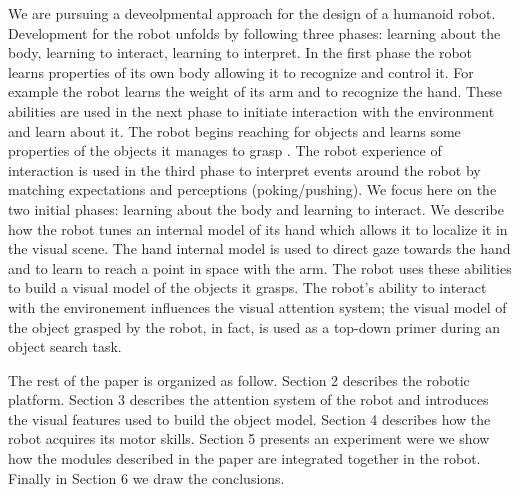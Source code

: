 We are pursuing a deveolpmental approach for the design of a humanoid robot. Development for the robot unfolds by following three phases: learning about the body, learning to interact, learning to interpret. In the first phase the robot learns properties of its own body allowing it to recognize and control it. For example the robot learns the weight of its arm and to recognize the hand. These abilities are used in the next phase to initiate interaction with the environment and learn about it. The robot begins reaching for objects and learns some properties of the objects it manages to grasp \cite{natale04learning,natale05exploring,torres-jara05tapping}. The robot experience of interaction is used in the third phase to interpret events around the robot by matching expectations and perceptions (poking/pushing). We focus here on the two initial phases: learning about the body and learning to interact. We describe how the robot tunes an internal model of its hand which allows it to localize it in the visual scene. The hand internal model is used to direct gaze towards the hand and to learn to reach a point in space with the arm. The robot uses these abilities to build a visual model of the objects it grasps. The robot's ability to interact with the environement influences the visual attention system; the visual model of the object grasped by the robot, in fact, is used as a top-down primer during an object search task.

The rest of the paper is organized as follow. Section 2 describes the robotic platform. Section 3 describes the attention system of the robot and introduces the visual features used to build the object model. Section 4 describes how the robot acquires its motor skills. Section 5 presents an experiment were we show how the modules described in the paper are integrated together in the robot. Finally in Section 6 we draw the conclusions.
